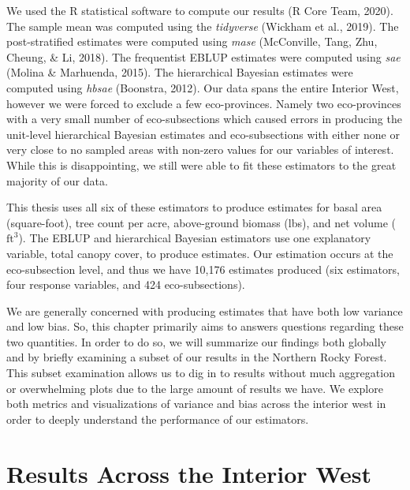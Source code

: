 \documentclass[12pt,twoside]{reedthesis}
\begin{document}
We used the R statistical software to compute our results (R Core Team, 2020). The sample mean was computed using the \emph{tidyverse} (Wickham et al., 2019). The post-stratified estimates were computed using \emph{mase} (McConville, Tang, Zhu, Cheung, \& Li, 2018). The frequentist EBLUP estimates were computed using \emph{sae} (Molina \& Marhuenda, 2015). The hierarchical Bayesian estimates were computed using \emph{hbsae} (Boonstra, 2012). Our data spans the entire Interior West, however we were forced to exclude a few eco-provinces. Namely two eco-provinces with a very small number of eco-subsections which caused errors in producing the unit-level hierarchical Bayesian estimates and eco-subsections with either none or very close to no sampled areas with non-zero values for our variables of interest. While this is disappointing, we still were able to fit these estimators to the great majority of our data.

This thesis uses all six of these estimators to produce estimates for basal area (square-foot), tree count per acre, above-ground biomass (lbs), and net volume (\(\text{ft}^3\)). The EBLUP and hierarchical Bayesian estimators use one explanatory variable, total canopy cover, to produce estimates. Our estimation occurs at the eco-subsection level, and thus we have 10,176 estimates produced (six estimators, four response variables, and 424 eco-subsections).

We are generally concerned with producing estimates that have both low variance and low bias. So, this chapter primarily aims to answers questions regarding these two quantities. In order to do so, we will summarize our findings both globally and by briefly examining a subset of our results in the Northern Rocky Forest. This subset examination allows us to dig in to results without much aggregation or overwhelming plots due to the large amount of results we have. We explore both metrics and visualizations of variance and bias across the interior west in order to deeply understand the performance of our estimators.

\hypertarget{results-across-the-interior-west}{%
\section{Results Across the Interior West}\label{results-across-the-interior-west}}
\end{document}
